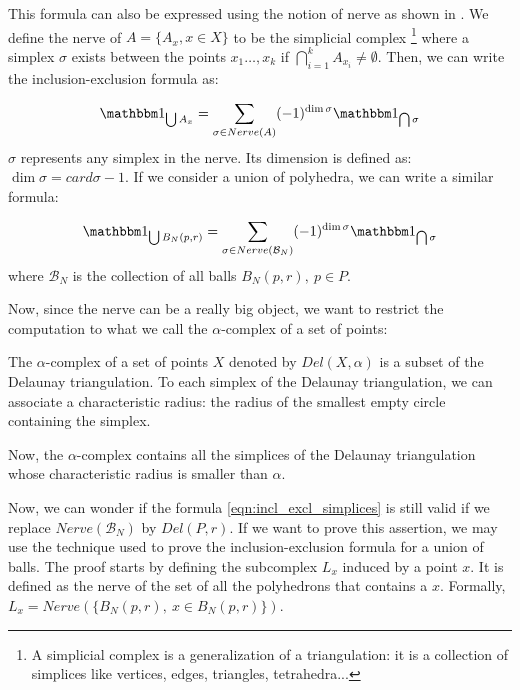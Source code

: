 This formula can also be expressed using the notion of nerve as shown in
\cite{attali2007inclusion}. We define the nerve of $ A = \{ A_x, x \in X \} $ to
be the simplicial complex \footnote{A simplicial complex is a generalization of
    a triangulation: it is a collection of simplices like vertices, edges,
    triangles, tetrahedra...} where a simplex $ \sigma $ exists between the
points $ x_1 \ldots, x_k $ if $ \bigcap\limits_{i=1}^k A_{x_i} \neq \emptyset $.
Then, we can write the inclusion-exclusion formula as:

$$ \indicator{\bigcup A_x} = \sum_{\sigma \in Nerve(A)} (-1)^{\dim \sigma}
\indicator{\bigcap \sigma} $$
$ \sigma $ represents any simplex in the nerve. Its dimension is defined as: $
\dim \sigma = card \sigma - 1 $. If we consider a union of polyhedra, we can write a similar formula:

\begin{equation}
    \indicator{\bigcup B_N(p, r)} = \sum_{\sigma \in Nerve(\mathcal{B}_N)} (-1)^{\dim \sigma}
    \indicator{\bigcap \sigma}
    \label{eqn:incl_excl_simplices}
\end{equation}
where $ \mathcal{B}_N $ is the collection of all balls $ B_N(p, r),~p \in P $.

Now, since the nerve can be a really big object, we want to restrict the
computation to what we call the $\alpha$-complex of a set of points:

\begin{definition} The $\alpha$-complex of a set of points $ X $ denoted by $
    Del(X, \alpha) $ is a subset of the Delaunay triangulation. To each simplex
    of the Delaunay triangulation, we can associate a characteristic
    radius: the radius of the smallest empty circle containing the simplex.

    Now, the $\alpha$-complex contains all the simplices of the Delaunay
    triangulation whose characteristic radius is smaller than $\alpha$.
\end{definition}

Now, we can wonder if the formula \ref{eqn:incl_excl_simplices} is still valid
if we replace $ Nerve(\mathcal{B}_N) $ by $ Del(P, r) $.  If we want to prove
this assertion, we may use the technique used to prove the inclusion-exclusion
formula for a union of balls. The proof starts by defining the subcomplex $ L_x
$ induced by a point $ x $. It is defined as the nerve of the set of all the
polyhedrons that contains a $ x $. Formally, $ L_x = Nerve(\{ B_N(p, r),~x \in
B_N(p, r)\}) $.

